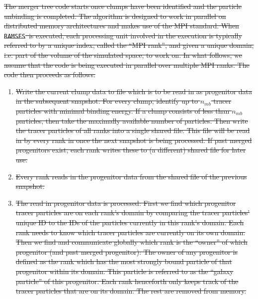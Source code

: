 \documentclass[a4paper,twocolumn,fleqn,usenatbib]{mnras}
\newcommand{\ramses}{\texttt{RAMSES}}
\providecommand{\DIFdel}[1]{{\protect\color{red}\sout{#1}}}                      %
\begin{document}
\DIFdel{The merger tree code starts once clumps have been identified and the particle unbinding is completed.
The algorithm is designed to work in parallel on distributed memory architectures and makes use of the MPI standard.
When \ramses\ is executed, each processing unit involved in the execution is typically referred to by a unique index, 
called the ``MPI rank'', and given a unique domain, i.e. part of the volume of the simulated space, to work on. 
In what follows, we assume that the code is being executed in parallel over multiple MPI ranks.
The code then proceeds as follows:
}%

\begin{enumerate}%
\item %
\DIFdel{Write the current clump data to file which is to be read in as progenitor data in the subsequent snapshot:
		For every clump, identify up to $n_{mb}$ tracer particles with minimal binding energy.
		If a clump consists of less than $n_{mb}$ particles, then take the maximally available number of particles.
		Then write the tracer particles of all ranks into a single shared file. 
		This file will be read in by every rank in once the next snapshot is being processed.
		If past merged progenitors exist, each rank writes these to (a different) shared file for later use.
}%

\item %
\DIFdel{Every rank reads in the progenitor data from the shared file of the previous snapshot.
	}%

\item %
\DIFdel{The read in progenitor data is processed:
		First we find which progenitor tracer particles are on each rank's domain by comparing the tracer particles' unique ID to the IDs of the particles currently in this rank's domain.
		Each rank needs to know which tracer particles are currently on its own domain.	
		Then we find and communicate globally which rank is the ``owner'' of which progenitor (and past merged progenitor): 
		The owner of any progenitor is defined as the rank which has the most strongly bound particle of that progenitor within its domain.
		This particle is referred to as the ``galaxy particle'' of this progenitor.
		Each rank henceforth only keeps track of the tracer particles that are on its domain.
		The rest are removed from memory.
}%


\end{enumerate}
\end{document}
